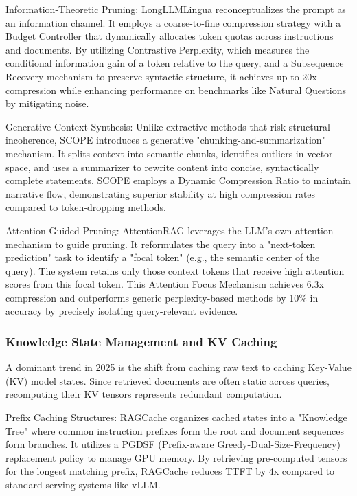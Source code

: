 \documentclass[11pt]{article}
\begin{document}
Information-Theoretic Pruning: LongLLMLingua \citep{jiang2024longllmlingua} reconceptualizes the prompt as an information channel. It employs a coarse-to-fine compression strategy with a Budget Controller that dynamically allocates token quotas across instructions and documents. By utilizing Contrastive Perplexity, which measures the conditional information gain of a token relative to the query, and a Subsequence Recovery mechanism to preserve syntactic structure, it achieves up to 20x compression while enhancing performance on benchmarks like Natural Questions by mitigating noise.

Generative Context Synthesis: Unlike extractive methods that risk structural incoherence, SCOPE \citep{zhang2025scope} introduces a generative "chunking-and-summarization" mechanism. It splits context into semantic chunks, identifies outliers in vector space, and uses a summarizer to rewrite content into concise, syntactically complete statements. SCOPE employs a Dynamic Compression Ratio to maintain narrative flow, demonstrating superior stability at high compression rates compared to token-dropping methods.

Attention-Guided Pruning: AttentionRAG \citep{fang2025attentionrag} leverages the LLM's own attention mechanism to guide pruning. It reformulates the query into a "next-token prediction" task to identify a "focal token" (e.g., the semantic center of the query). The system retains only those context tokens that receive high attention scores from this focal token. This Attention Focus Mechanism achieves 6.3x compression and outperforms generic perplexity-based methods by 10\% in accuracy by precisely isolating query-relevant evidence.

\subsubsection{Knowledge State Management and KV Caching}
A dominant trend in 2025 is the shift from caching raw text to caching Key-Value (KV) model states. Since retrieved documents are often static across queries, recomputing their KV tensors represents redundant computation.

Prefix Caching Structures: RAGCache \citep{jin2025ragcache} organizes cached states into a "Knowledge Tree" where common instruction prefixes form the root and document sequences form branches. It utilizes a PGDSF (Prefix-aware Greedy-Dual-Size-Frequency) replacement policy to manage GPU memory. By retrieving pre-computed tensors for the longest matching prefix, RAGCache reduces TTFT by 4x compared to standard serving systems like vLLM.
\end{document}
